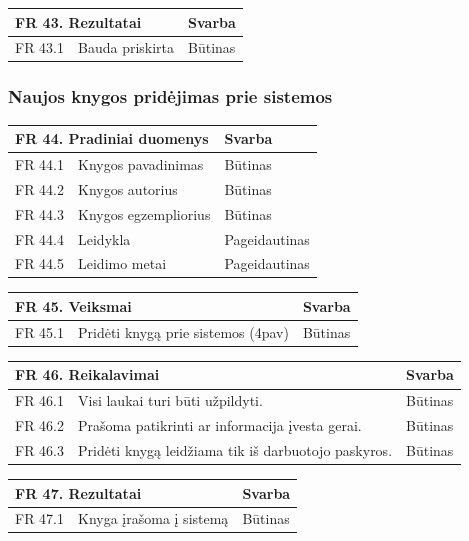 \documentclass{VUMIFPSkursinis}
\begin{document}
    \vspace{5mm}
     \begin{tabular}{ | p{} | p{} | p{} |}
    \hline
     \multicolumn{2}{|l|}{ FR 43. Rezultatai } &Svarba  \\ \hline 
 FR 43.1& Bauda priskirta& Būtinas\\ \hline

    \end{tabular}

 \subsubsection{Naujos knygos pridėjimas prie sistemos}
 
 \noindent
 \vspace{5mm}
 \begin{tabular}{ | p{} | p{} | p{} |}
    \hline
    \multicolumn{2}{|l|}{FR 44. Pradiniai duomenys} &Svarba  \\ \hline 
  FR 44.1& Knygos pavadinimas& Būtinas\\ \hline
 FR 44.2& Knygos autorius& Būtinas\\ \hline
 FR 44.3& Knygos egzempliorius& Būtinas\\ \hline
 FR 44.4& Leidykla& Pageidautinas\\ \hline
 FR 44.5& Leidimo metai& Pageidautinas\\ \hline
  \end{tabular}
    \vspace{5mm}   
 \begin{tabular}{ | p{} | p{} | p{} |}
    \hline
        \multicolumn{2}{|l|}{   FR 45. Veiksmai} &Svarba  \\ \hline 
FR 45.1& Pridėti knygą prie sistemos (4pav)& Būtinas\\ \hline 
    \end{tabular}
    \vspace{5mm}  
    \begin{tabular}{ | p{} | p{} | p{} |}
    \hline
     \multicolumn{2}{|l|}{   FR 46. Reikalavimai} &Svarba  \\ \hline 
FR 46.1  &Visi laukai turi būti užpildyti.& Būtinas \\ \hline
FR 46.2  & Prašoma patikrinti ar informacija įvesta gerai.&Būtinas\\ \hline
FR 46.3 &  Pridėti knygą leidžiama tik iš darbuotojo paskyros. &Būtinas\\ \hline
    \end{tabular}
    \vspace{5mm}
     \begin{tabular}{ | p{} | p{} | p{} |}
    \hline
     \multicolumn{2}{|l|}{ FR 47. Rezultatai } &Svarba  \\ \hline 
 FR 47.1& Knyga įrašoma į sistemą& Būtinas\\ \hline

    \end{tabular}
\end{document}
